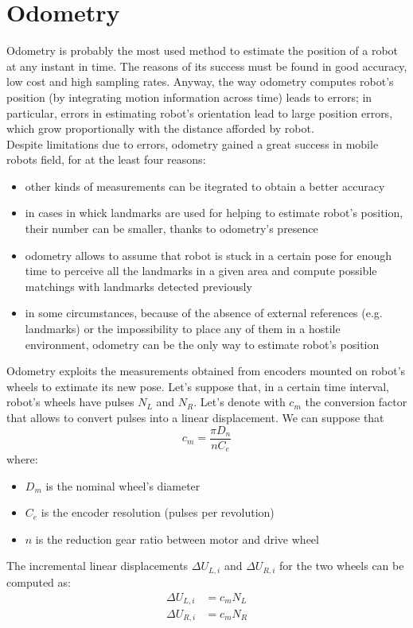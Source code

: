\documentclass[a4paper, onecolumn]{report}
\begin{document}
\section{Odometry}
Odometry is probably the most used method to estimate the position of a robot at any instant in time. The reasons of its success must be found in good accuracy, low cost and high sampling rates. Anyway, the way odometry computes robot's position (by integrating motion information across time) leads to errors; in particular, errors in estimating robot's orientation lead to large position errors, which grow proportionally with the distance afforded by robot. \\
Despite limitations due to errors, odometry gained a great success in mobile robots field, for at the least four reasons:
\begin{itemize}
\item{other kinds of measurements can be itegrated to obtain a better accuracy}
\item{in cases in whick landmarks are used for helping to estimate robot's position, their number can be smaller, thanks to odometry's presence}
\item{odometry allows to assume that robot is stuck in a certain pose for enough time to perceive all the landmarks in a given area and compute possible matchings with landmarks detected previously}
\item{in some circumstances, because of the absence of external references (e.g. landmarks) or the impossibility to place any of them in a hostile environment, odometry can be the only way to estimate robot's position}
\end{itemize}
Odometry exploits the measurements obtained from encoders mounted on robot's wheels to extimate its new pose. Let's suppose that, in a certain time interval, robot's wheels have pulses $N_L$ and $N_R$. Let's denote with $c_m$ the conversion factor that allows to convert pulses into a linear displacement. We can suppose that
\begin{equation}
	c_m = \frac{\pi D_n}{nC_e}
\end{equation}
where:
\begin{itemize}
\item{$D_m$ is the nominal wheel's diameter}
\item{$C_e$ is the encoder resolution (pulses per revolution)}
\item{$n$ is the reduction gear ratio between motor and drive wheel}
\end{itemize}
The incremental linear displacements $\Delta U_{L,i}$ and $\Delta U_{R,i}$ for the two wheels can be computed as:
\begin{equation}
	\begin{aligned}
		\Delta U_{L,i} &= c_m N_L \\
		\Delta U_{R,i} &= c_m N_R
	\end{aligned}
\end{equation}
\end{document}
